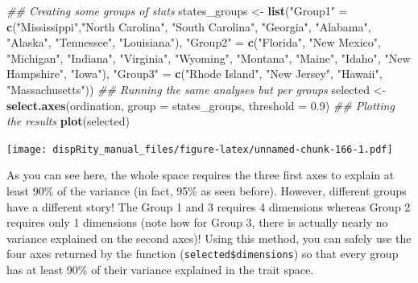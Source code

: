 \documentclass[
]{book}
\newenvironment{Shaded}{\begin{snugshade}}{\end{snugshade}}
\newcommand{\CommentTok}[1]{\textcolor[rgb]{0.56,0.35,0.01}{\textit{#1}}}
\newcommand{\DataTypeTok}[1]{\textcolor[rgb]{0.13,0.29,0.53}{#1}}
\newcommand{\FloatTok}[1]{\textcolor[rgb]{0.00,0.00,0.81}{#1}}
\newcommand{\KeywordTok}[1]{\textcolor[rgb]{0.13,0.29,0.53}{\textbf{#1}}}
\newcommand{\NormalTok}[1]{#1}
\newcommand{\StringTok}[1]{\textcolor[rgb]{0.31,0.60,0.02}{#1}}
\begin{document}
\begin{Shaded}
\begin{Highlighting}[]
\CommentTok{\#\# Creating some groups of stats}
\NormalTok{states\_groups \textless{}{-}}\StringTok{ }\KeywordTok{list}\NormalTok{(}\StringTok{"Group1"}\NormalTok{ =}\StringTok{ }\KeywordTok{c}\NormalTok{(}\StringTok{"Mississippi"}\NormalTok{,}\StringTok{"North Carolina"}\NormalTok{,}
                                   \StringTok{"South Carolina"}\NormalTok{, }\StringTok{"Georgia"}\NormalTok{, }\StringTok{"Alabama"}\NormalTok{,}
                                   \StringTok{"Alaska"}\NormalTok{, }\StringTok{"Tennessee"}\NormalTok{, }\StringTok{"Louisiana"}\NormalTok{),}
                      \StringTok{"Group2"}\NormalTok{ =}\StringTok{ }\KeywordTok{c}\NormalTok{(}\StringTok{"Florida"}\NormalTok{, }\StringTok{"New Mexico"}\NormalTok{, }\StringTok{"Michigan"}\NormalTok{,}
                                   \StringTok{"Indiana"}\NormalTok{, }\StringTok{"Virginia"}\NormalTok{, }\StringTok{"Wyoming"}\NormalTok{, }\StringTok{"Montana"}\NormalTok{,}
                                   \StringTok{"Maine"}\NormalTok{, }\StringTok{"Idaho"}\NormalTok{, }\StringTok{"New Hampshire"}\NormalTok{, }\StringTok{"Iowa"}\NormalTok{),}
                      \StringTok{"Group3"}\NormalTok{ =}\StringTok{ }\KeywordTok{c}\NormalTok{(}\StringTok{"Rhode Island"}\NormalTok{, }\StringTok{"New Jersey"}\NormalTok{, }\StringTok{"Hawaii"}\NormalTok{, }\StringTok{"Massachusetts"}\NormalTok{))}
\CommentTok{\#\# Running the same analyses but per groups}
\NormalTok{selected \textless{}{-}}\StringTok{ }\KeywordTok{select.axes}\NormalTok{(ordination, }\DataTypeTok{group =}\NormalTok{ states\_groups, }\DataTypeTok{threshold =} \FloatTok{0.9}\NormalTok{)}
\CommentTok{\#\# Plotting the results}
\KeywordTok{plot}\NormalTok{(selected)}
\end{Highlighting}
\end{Shaded}

\texttt{[image: dispRity\_manual\_files/figure-latex/unnamed-chunk-166-1.pdf]}

As you can see here, the whole space requires the three first axes to explain at least 90\% of the variance (in fact, 95\% as seen before).
However, different groups have a different story!
The Group 1 and 3 requires 4 dimensions whereas Group 2 requires only 1 dimensions (note how for Group 3, there is actually nearly no variance explained on the second axes)!
Using this method, you can safely use the four axes returned by the function (\texttt{selected\$dimensions}) so that every group has at least 90\% of their variance explained in the trait space.
\end{document}
